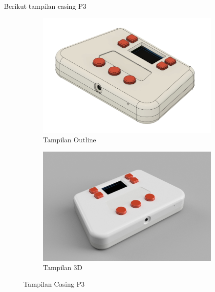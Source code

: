 \documentclass{book} %
\begin{document}
	\newpage
	Berikut tampilan casing P3
	
	\begin{figure}[!ht]
		\centering
		\begin{subfigure}[t]{0.45\textwidth}
			\includegraphics[width=\textwidth]{images/p3_casing_outline}
			\caption{Tampilan Outline}
		\end{subfigure}
		\begin{subfigure}[t]{0.45\textwidth}
			\includegraphics[width=\textwidth]{images/p3_casing}
			\caption{Tampilan 3D}
		\end{subfigure}
		\caption{Tampilan Casing P3}
	\end{figure}
\end{document}
